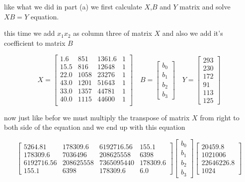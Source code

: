 \documentclass{article}
\begin{document}
	like what we did in part (a) we first calculate \(X\),\(B\) and \(Y\) matrix and solve \(X B = Y\) equation.
	
	this time we add \(x_1 x_2\) as column three of matrix \(X\) and also we add it's coefficient to matrix \(B\)
	
	\[
	X=
	\begin{bmatrix}
		1.6 & 851 & 1361.6 & 1 \\
		15.5 & 816 & 12648 & 1 \\
		22.0 & 1058 & 23276 & 1 \\
		43.0 & 1201 & 51643 & 1 \\
		33.0 & 1357 & 44781 & 1 \\
		40.0 & 1115 & 44600 & 1 \\
	\end{bmatrix}
	\quad B=
	\begin{bmatrix}
		b_0 \\
		b_1 \\
		b_2 \\
		b_3
	\end{bmatrix} \quad Y=
	\begin{bmatrix}
		293 \\
		230 \\
		172 \\
		91 \\
		113 \\
		125 
	\end{bmatrix}
	\]
	
	now just like befor we must multiply the transpose of matrix \(X\) from right to both side of the equation and we end up with this equation
	
	\[
	\begin{bmatrix}
		5264.81 & 178309.6 & 6192716.56 & 155.1 \\
		178309.6 & 7036496 & 208625558 & 6398 \\
		6192716.56 & 208625558 & 7365095440 & 178309.6 \\
		155.1 & 6398 & 178309.6 & 6.0
	\end{bmatrix}
	\begin{bmatrix}
		b_0 \\
		b_1 \\
		b_2 \\
		b_3
	\end{bmatrix}
	\begin{bmatrix}
		20459.8 \\
		1021006 \\
		22646226.8 \\
		1024 
	\end{bmatrix}
	\]
	
\end{document}
